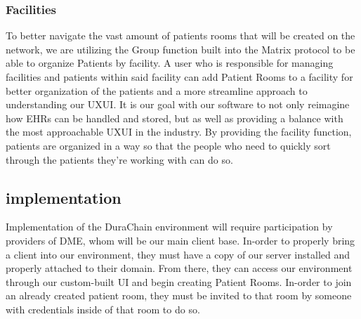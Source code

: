 \documentclass[preprint,pre,floats,aps,amsmath,amssymb]{revtex4-1}
\begin{document}


\subsubsection{Facilities}
To better navigate the vast amount of patients rooms that will be created on the network, we are utilizing the Group function built into the Matrix protocol to be able to organize Patients by facility. A user who is responsible for managing facilities and patients within said facility can add Patient Rooms to a facility for better organization of the patients and a more streamline approach to understanding our UXUI. It is our goal with our software to not only reimagine how EHRs can be handled and stored, but as well as providing a balance with the most approachable UXUI in the industry. By providing the facility function, patients are organized in a way so that the people who need to quickly sort through the patients they’re working with can do so.

\subsection{implementation}
Implementation of the DuraChain environment will require participation by providers of DME, whom will be our main client base. In-order to properly bring a client into our environment, they must have a copy of our server installed and properly attached to their domain. From there, they can access our environment through our custom-built UI and begin creating Patient Rooms. In-order to join an already created patient room, they must be invited to that room by someone with credentials inside of that room to do so.
\end{document}

